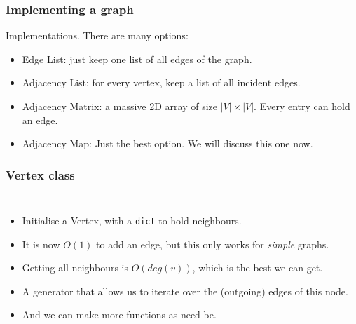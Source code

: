 \begin{frame}
	\frametitle{Implementing a graph}

Implementations. There are many options:
		\begin{itemize}
			\item Edge List: just keep one list of all edges of the graph.
				
			\item Adjacency List: for every vertex, keep a list of all incident edges.
				
			\item Adjacency Matrix: a massive 2D array of size $|V|\times |V|$. Every entry can hold an edge.
				
			\item Adjacency Map: Just the best option. We will discuss this one now.
		\end{itemize}
\end{frame}

\begin{frame}
	\frametitle{Vertex class}
	
	\begin{columns}[T]
			
		\begin{itemize}
			\item Initialise a Vertex, with a \texttt{dict} to hold neighbours.
			\item It is now $O(1)$ to add an edge, but this only works for \textit{simple} graphs.
			\item Getting all neighbours is $O(\mathit{deg}(v))$, which is the best we can get.
			\item A generator that allows us to iterate over the (outgoing) edges of this node.
			\item And we can make more functions as need be.
		\end{itemize}
			
	\end{columns}
\end{frame}

